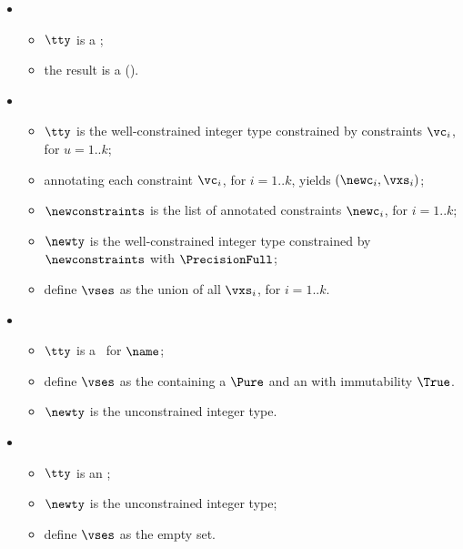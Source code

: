 \ProseParagraph
\OneApplies
\begin{itemize}
  \item {}
    \begin{itemize}
      \item $\tty$ is a \pendingconstrainedintegertypeterm;
      \item the result is a \typingerrorterm{} (\UnexpectedType).
    \end{itemize}
  \item {}
    \begin{itemize}
      \item $\tty$ is the well-constrained integer type constrained by
        constraints $\vc_i$, for $u=1..k$;
      \item annotating each constraint $\vc_i$, for $i=1..k$,
      yields $(\newc_i, \vxs_i)$\ProseOrTypeError;
      \item $\newconstraints$ is the list of annotated constraints $\newc_i$,
      for $i=1..k$;
      \item $\newty$ is the well-constrained integer type constrained
        by $\newconstraints$ with $\PrecisionFull$;
      \item define $\vses$ as the union of all $\vxs_i$, for $i=1..k$.
    \end{itemize}

    \item {}
    \begin{itemize}
      \item $\tty$ is a \parameterizedintegertypeterm\ for $\name$;
      \item define $\vses$ as the \sideeffectsetterm{} containing a $\Pure$ \LocalEffectTerm{} and an \ImmutabilityTerm{} with immutability $\True$.
      \item $\newty$ is the unconstrained integer type.
    \end{itemize}

    \item {}
    \begin{itemize}
      \item $\tty$ is an \unconstrainedintegertypeterm;
      \item $\newty$ is the unconstrained integer type;
      \item define $\vses$ as the empty set.
    \end{itemize}
  \end{itemize}

